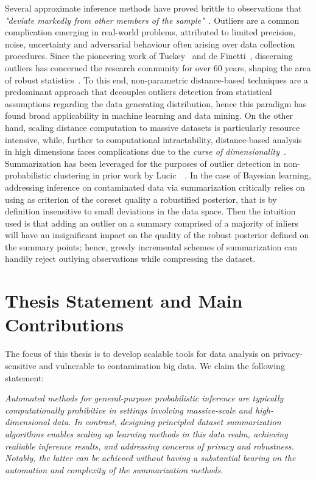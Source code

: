  Several approximate inference methods have proved brittle to observations that \emph{"deviate markedly from other members of the sample"}~\citep{grubbs69}. Outliers are a common complication emerging in real-world problems, attributed to limited precision, noise, uncertainty and adversarial behaviour often arising over data collection procedures. Since the pioneering work of Tuckey~\citep{tukey60} and de Finetti~\citep{definetti61}, discerning outliers has concerned the research community for over 60 years, shaping the area of robust statistics~\citep{huber09}. To this end, non-parametric distance-based techniques are a predominant approach that decouples outliers detection from statistical assumptions regarding the data generating distribution, hence this paradigm has found broad applicability in machine learning and data mining. On the other hand, scaling distance computation to massive datasets is particularly resource intensive, while, further to computational intractability, distance-based analysis in high dimensions faces complications due to the \emph{curse of dimensionality}~\citep{vershynin18,wainwright19}. Summarization has been leveraged for the purposes of outlier detection in non-probabilistic clustering in prior work by Lucic~\etal~\citep{lucic16outliers}. In the case of Bayesian learning, addressing inference on contaminated data via summarization critically relies on using as criterion of the coreset quality a robustified posterior, that is by definition insensitive to small deviations in the data space. Then the intuition used is that adding an outlier on a summary comprised of a majority of inliers will have an insignificant impact on the quality of the robust posterior defined on the summary points; hence, greedy incremental schemes of summarization can handily reject outlying observations while compressing the dataset.

\section{Thesis Statement and Main Contributions}
\label{sec:thesis-goals}

The focus of this thesis is to develop scalable tools for data analysis on privacy-sensitive and vulnerable to contamination big data. We claim the following statement:

\emph{Automated methods for general-purpose probabilistic inference are typically computationally prohibitive in settings involving massive-scale and high-dimensional data. In contrast, designing principled dataset summarization algorithms enables scaling up learning methods in this data realm, achieving realiable inference results, and addressing concerns of privacy and robustness. Notably, the latter can be achieved without having a substantial bearing on the automation and complexity of the summarization methods.}

